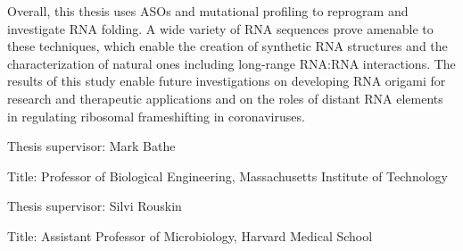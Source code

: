 \documentclass[main.tex]{subfiles}
\begin{document}
\begin{spacing}{1.0}
Overall, this thesis uses ASOs and mutational profiling to reprogram and investigate RNA folding. A wide variety of RNA sequences prove amenable to these techniques, which enable the creation of synthetic RNA structures and the characterization of natural ones including long-range RNA:RNA interactions. The results of this study enable future investigations on developing RNA origami for research and therapeutic applications and on the roles of distant RNA elements in regulating ribosomal frameshifting in coronaviruses.

\end{spacing}

\vspace{1cm}


\noindent
Thesis supervisor: Mark Bathe

\noindent
Title: Professor of Biological Engineering, Massachusetts Institute of Technology

\noindent
Thesis supervisor: Silvi Rouskin

\noindent
Title: Assistant Professor of Microbiology, Harvard Medical School
\end{document}
